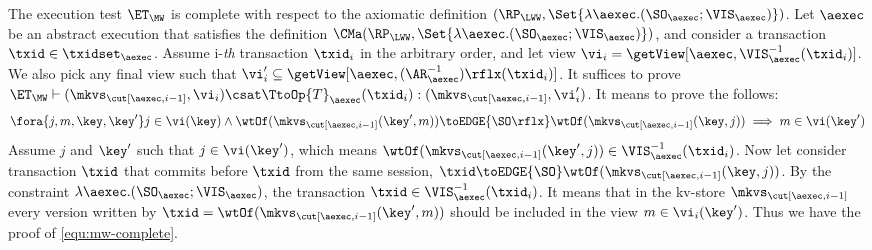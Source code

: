 The execution test $\ET_{\MW}$ is complete with respect to 
the axiomatic definition $(\RP_{\LWW}, \Set{\lambda \aexec.(\SO_{\aexec} ; \VIS_{\aexec})})$. 
Let $\aexec$ be an abstract execution that satisfies the definition
$\CMa(\RP_{\LWW}, \Set{\lambda \aexec.(\SO_{\aexec} ; \VIS_{\aexec})})$, 
and consider a transaction $\txid \in \txidset_{\aexec}$. 
Assume i-\emph{th} transaction \( \txid_i \) in the arbitrary order,
and let view \( \vi_{i} = \getView[\aexec, \VIS^{-1}_{\aexec}(\txid_{i})] \).
We also pick any final view such that \( \vi'_{i} \subseteq \getView[\aexec, (\AR^{-1}_{\aexec})\rflx(\txid_{i})] \).
It suffices to prove \( \ET_\MW \vdash (\mkvs_{\cut[\aexec, i-1]}, \vi_i ) \csat  \TtoOp{T}_{\aexec}(\txid_{i}) : (\mkvs_{\cut[\aexec, i-1]}, \vi'_{i}) \).
It means to prove the follows:
\begin{equation}
\label{equ:mw-complete}
\begin{array}{@{}l@{}}
    \fora{j,m,\key, \key' } j \in \vi(\key)  
    \land \wtOf(\mkvs_{\cut[\aexec, i-1]}(\key', m)) \toEDGE{\SO\rflx} \wtOf(\mkvs_{\cut[\aexec, i-1]}(\key, j))  
    \implies m \in \vi(\key')
\end{array}
\end{equation}
Assume \( j \) and \( \key' \) such that \( j \in \vi(\key')\), which means \( \wtOf(\mkvs_{\cut[\aexec, i-1]}(\key', j)) \in \VIS^{-1}_{\aexec}(\txid_{i}) \).
Now let consider transaction \( \txid \) that commits before \( \txid \) from the same session, \ie \( \txid \toEDGE{\SO} \wtOf(\mkvs_{\cut[\aexec, i-1]}(\key, j)) \).
By the constraint \( \lambda \aexec.(\SO_{\aexec} ; \VIS_{\aexec}) \), the transaction \( \txid \in \VIS^{-1}_{\aexec}(\txid_{i}) \).
It means that in the kv-store \(  \mkvs_{\cut[\aexec, i-1]} \) every version written by \( \txid =  \wtOf(\mkvs_{\cut[\aexec, i-1]}(\key', m)) \) should be included in the view \( m \in \vi_i(\key') \).
Thus we have the proof of \cref{equ:mw-complete}.
